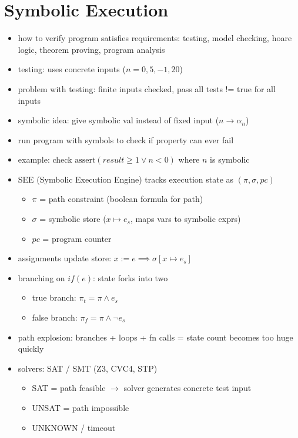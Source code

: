 \documentclass[11pt]{book}
\begin{document}
\setcounter{chapter}{2}
\chapter{Symbolic Execution}

\begin{itemize}
\item how to verify program satisfies requirements: testing, model checking, hoare logic, theorem proving, program analysis

\item testing: uses concrete inputs ($n=0, 5, -1, 20$)
\item problem with testing: finite inputs checked, pass all tests != true for all inputs

\item symbolic idea: give symbolic val instead of fixed input ($n \rightarrow \alpha_n$)
\item run program with symbols to check if property can ever fail
\item example: check $\text{assert}(result \geq 1 \lor n < 0)$ where $n$ is symbolic

\item SEE (Symbolic Execution Engine) tracks execution state as $(\pi, \sigma, pc)$
\begin{itemize}
    \item $\pi$ = path constraint (boolean formula for path)
    \item $\sigma$ = symbolic store ($x \mapsto e_s$, maps vars to symbolic exprs)
    \item $pc$ = program counter
\end{itemize}

\item assignments update store: $x := e \implies \sigma[x \mapsto e_s]$

\item branching on $if(e)$: state forks into two
\begin{itemize}
    \item true branch: $\pi_t = \pi \land e_s$
    \item false branch: $\pi_f = \pi \land \neg e_s$
\end{itemize}

\item path explosion: branches + loops + fn calls = state count becomes too huge quickly

\item solvers: SAT / SMT (Z3, CVC4, STP)
\begin{itemize}
    \item SAT = path feasible $\rightarrow$ solver generates concrete test input
    \item UNSAT = path impossible
    \item UNKNOWN / timeout
\end{itemize}


\end{itemize}
\end{document}
